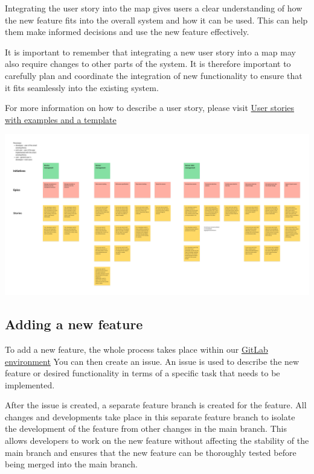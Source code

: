 \documentclass[12pt]{article}
\newcounter{fr}
\begin{document}
Integrating the user story into the map gives users a clear understanding of how the new feature fits into the overall system and how it can be used. This can help them make informed decisions and use the new feature effectively.

It is important to remember that integrating a new user story into a map may also require changes to other parts of the system. It is therefore important to carefully plan and coordinate the integration of new functionality to ensure that it fits seamlessly into the existing system.

For more information on how to describe a user story, please visit \href{https://www.atlassian.com/agile/project-management/user-stories}{User stories with examples and a template}

 \includegraphics[width=\textwidth]{user_story_map.png}
 

\subsection{Adding a new feature}

To add a new feature, the whole process takes place within our \href{https://gitlab.uni-ulm.de/se-anwendungsprojekt-22-23}{GitLab environment}
You can then create an issue. An issue is used to describe the new feature or desired functionality in terms of a specific task that needs to be implemented.

After the issue is created, a separate feature branch is created for the feature. All changes and developments take place in this separate feature branch to isolate the development of the feature from other changes in the main branch. This allows developers to work on the new feature without affecting the stability of the main branch and ensures that the new feature can be thoroughly tested before being merged into the main branch.
\end{document}

